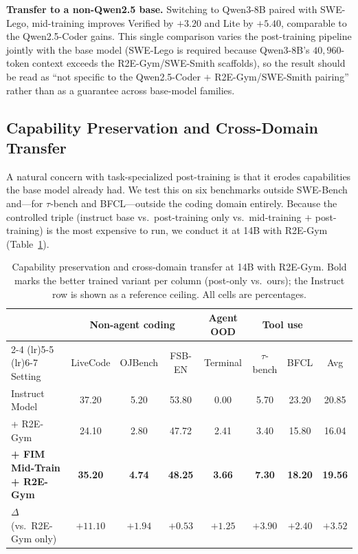 \textbf{Transfer to a non-Qwen2.5 base.}
Switching to Qwen3-8B paired with SWE-Lego, mid-training improves
Verified by $+3.20$ and Lite by $+5.40$, comparable to the Qwen2.5-Coder
gains. This single comparison varies the post-training pipeline jointly
with the base model (SWE-Lego is required because Qwen3-8B's
$40{,}960$-token context exceeds the R2E-Gym/SWE-Smith scaffolds), so the
result should be read as ``not specific to the Qwen2.5-Coder $+$
R2E-Gym/SWE-Smith pairing'' rather than as a guarantee across
base-model families.

\vspace{-0.5ex}
\subsection{Capability Preservation and Cross-Domain Transfer}
\label{sec:exp:gen}

A natural concern with task-specialized post-training is that it erodes
capabilities the base model already had. We test this on six benchmarks
outside SWE-Bench and---for $\tau$-bench and BFCL---outside the coding
domain entirely. Because the controlled triple (instruct base vs.\
post-training only vs.\ mid-training $+$ post-training) is the most
expensive to run, we conduct it at 14B with R2E-Gym
(Table~\ref{tab:cap}).

\begin{table}[t]
\centering
\caption{Capability preservation and cross-domain transfer at 14B with
R2E-Gym. Bold marks the better trained variant per column (post-only
vs.\ ours); the Instruct row is shown as a reference ceiling. All cells
are percentages.}
\label{tab:cap}
\small
\setlength{\tabcolsep}{4pt}
\begin{tabular}{lcccccc|c}
\toprule
& \multicolumn{3}{c}{Non-agent coding}
& \multicolumn{1}{c}{Agent OOD}
& \multicolumn{2}{c}{Tool use}
& \\
\cmidrule(lr){2-4} \cmidrule(lr){5-5} \cmidrule(lr){6-7}
Setting
& LiveCode & OJBench & FSB-EN
& Terminal
& $\tau$-bench & BFCL
& Avg \\
\midrule
Instruct Model
  & 37.20 & 5.20 & 53.80
  & 0.00
  & 5.70 & 23.20
  & 20.85 \\
+ R2E-Gym
  & 24.10 & 2.80 & 47.72
  & 2.41
  & 3.40 & 15.80
  & 16.04 \\
\textbf{+ FIM Mid-Train + R2E-Gym}
  & \textbf{35.20} & \textbf{4.74} & \textbf{48.25}
  & \textbf{3.66}
  & \textbf{7.30} & \textbf{18.20}
  & \textbf{19.56} \\
\rowcolor{blue!8}
$\Delta$ (vs.\ R2E-Gym only)
  & $+11.10$ & $+1.94$ & $+0.53$
  & $+1.25$
  & $+3.90$ & $+2.40$
  & $+3.52$ \\
\bottomrule
\end{tabular}
\end{table}

